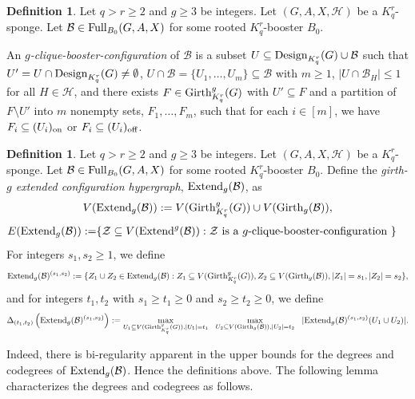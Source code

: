 \documentclass[11pt]{article}
\newcommand{\mc}[1]{\mathcal{#1}}
\newcounter{i}
\theoremstyle{plain}
\theoremstyle{plain} %
\theoremstyle{definition}
\newtheorem{definition}[thm]{Definition}
\begin{document}
\begin{definition}\label{def:CliqueBoosterConfig}
Let $q>r\ge 2$ and $g\ge 3$ be integers. Let $(G,A,X,\mc{H})$ be a $K_q^r$-sponge. Let $\mc{B} \in {\rm Full}_{B_0}(G,A,X)$ for some rooted $K_q^r$-booster $B_0$.

An \emph{$g$-clique-booster-configuration} of $\mc{B}$ is a subset $U\subseteq {\rm Design}_{K_q^r}(G)\cup \mc{B}$ such that $U'= U\cap {\rm Design}_{K_q^r}(G)\ne \emptyset$, $U\cap \mc{B} =\{U_1,\ldots,U_m\}\subseteq \mc{B}$ with $m\ge 1$, $|U\cap \mc{B}_H|\le 1$ for all $H\in \mc{H}$, and there exists $F\in {\rm Girth}_{K_q^r}^g(G)$ with $U'\subseteq F$ and a partition of $F\setminus U'$ into $m$ nonempty sets, $F_1,\ldots, F_m$, such that for each $i\in [m]$, we have $F_i\subseteq (U_i)_{\rm on}$ or $F_i\subseteq (U_i)_{\rm off}$.
\end{definition}


\begin{definition}\label{def:ExtendConfig}
Let $q>r\ge 2$ and $g\ge 3$ be integers. Let $(G,A,X,\mc{H})$ be a $K_q^r$-sponge. Let $\mc{B} \in {\rm Full}_{B_0}(G,A,X)$ for some rooted $K_q^r$-booster $B_0$.
Define the \emph{girth-$g$ extended configuration hypergraph}, ${\rm Extend}_g(\mc{B})$, as
$$V({\rm Extend}_g(\mc{B})) := V({\rm Girth}^g_{K_q^r}(G))\cup V({\rm Girth}_g(\mc{B})),$$
\begin{align*}
E({\rm Extend}_g(\mc{B})):= &\{ \mc{Z} \subseteq V({\rm Extend}^g(\mc{B})): \mc{Z} \text{ is a $g$-clique-booster-configuration }\}
\end{align*}
For integers $s_1, s_2\ge 1$, we define 
$${\rm Extend}_g(\mc{B})^{(s_1,s_2)}:= \{Z_1\cup Z_2\in {\rm Extend}_g(\mc{B}): Z_1\subseteq V({\rm Girth}^g_{K_q^r}(G)), Z_2\subseteq V({\rm Girth}_g(\mc{B})), |Z_1|=s_1, |Z_2|=s_2\},$$ 
and for integers $t_1,t_2$ with $s_1\ge t_1\ge 0$ and $s_2\ge t_2\ge 0$, we define
$$\Delta_{(t_1,t_2)}\left({\rm Extend}_g(\mc{B})^{(s_1,s_2)}\right) := \max_{U_1\subseteq V({\rm Girth}^g_{K_q^r}(G)), |U_1|=t_1}~~\max_{U_2\subseteq V({\rm Girth}_g(\mc{B})), |U_2|=t_2}~~|{\rm Extend}_g(\mc{B})^{(s_1,s_2)}(U_1\cup U_2)|.$$
\end{definition}

Indeed, there is bi-regularity apparent in the upper bounds for the degrees and codegrees of ${\rm Extend}_g(\mc{B})$. Hence the definitions above. The following lemma characterizes the degrees and codegrees as follows.
\end{document}
